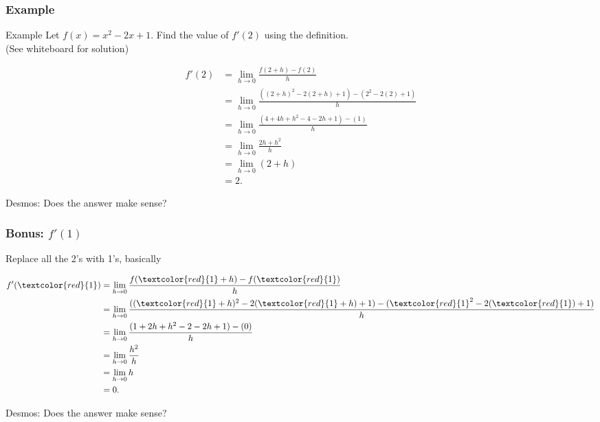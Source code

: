 \documentclass{beamer}
\begin{document}
\begin{frame}
    \frametitle{Example}

    \begin{exampleblock}{Example}
        Let $f(x) = x^2 - 2x + 1$. Find the value of $f'(2)$ using the definition. \\

        (See whiteboard for solution)
    \end{exampleblock}  \pause

    \begin{align*}
        f'(2) &= \lim_{h \to 0} \frac{f(2+h) - f(2)}{h} \\
        &= \lim_{h \to 0} \frac{((2+h)^2 - 2(2+h) + 1) - (2^2 - 2(2) + 1)}{h} \\
        &= \lim_{h \to 0} \frac{(4+4h+h^2 - 4 - 2h + 1)-(1)}{h} \\
        &= \lim_{h \to 0} \frac{2h+h^2}{h} \\
        &= \lim_{h \to 0} (2 + h) \\
        &= 2. 
    \end{align*}

Desmos: Does the answer make sense? 

\end{frame}

\begin{frame}
    \frametitle{Bonus: $f'(1)$}

    Replace all the 2's with 1's, basically

    \begin{align*}
        f'(\textcolor{red}{1}) &= \lim_{h \to 0} \frac{f(\textcolor{red}{1}+h) - f(\textcolor{red}{1})}{h} \\
        &= \lim_{h \to 0} \frac{((\textcolor{red}{1}+h)^2 - 2(\textcolor{red}{1}+h) + 1) - (\textcolor{red}{1}^2 - 2(\textcolor{red}{1}) + 1)}{h} \\
        &= \lim_{h \to 0} \frac{(1+2h + h^2 - 2 - 2h + 1)-(0)}{h} \\
        &= \lim_{h \to 0} \frac{h^2}{h} \\
        &= \lim_{h \to 0} h \\
        &= 0.
    \end{align*}
    
    Desmos: Does the answer make sense? 

\end{frame}
\end{document}
